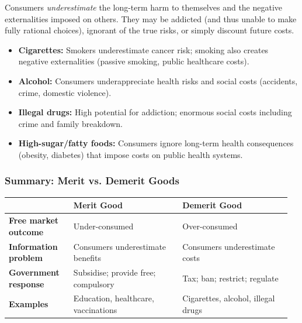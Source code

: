 \documentclass[11pt, a4paper, twoside]{book}
\begin{document}
Consumers \emph{underestimate} the long-term harm to themselves and the negative externalities imposed on others. They may be addicted (and thus unable to make fully rational choices), ignorant of the true risks, or simply discount future costs.

\begin{example}
\begin{itemize}
  \item \textbf{Cigarettes:} Smokers underestimate cancer risk; smoking also creates negative externalities (passive smoking, public healthcare costs).
  \item \textbf{Alcohol:} Consumers underappreciate health risks and social costs (accidents, crime, domestic violence).
  \item \textbf{Illegal drugs:} High potential for addiction; enormous social costs including crime and family breakdown.
  \item \textbf{High-sugar/fatty foods:} Consumers ignore long-term health consequences (obesity, diabetes) that impose costs on public health systems.
\end{itemize}
\end{example}

\subsubsection{Summary: Merit vs. Demerit Goods}

\begin{tcolorbox}[
  enhanced, colback=LightBlue, colframe=NavyPrimary,
  arc=0pt, boxrule=0.7pt
]
\begin{tabular}{@{}>{\RaggedRight\arraybackslash}p{0.22\linewidth}>{\RaggedRight\arraybackslash}p{0.37\linewidth}>{\RaggedRight\arraybackslash}p{0.37\linewidth}@{}}
& \textbf{\color{NavyPrimary}Merit Good} & \textbf{\color{NavyPrimary}Demerit Good} \\
\midrule
\textbf{Free market outcome} & Under-consumed & Over-consumed \\
\textbf{Information problem} & Consumers underestimate benefits & Consumers underestimate costs \\
\textbf{Government response} & Subsidise; provide free; compulsory & Tax; ban; restrict; regulate \\
\textbf{Examples} & Education, healthcare, vaccinations & Cigarettes, alcohol, illegal drugs \\
\end{tabular}
\end{tcolorbox}
\end{document}
